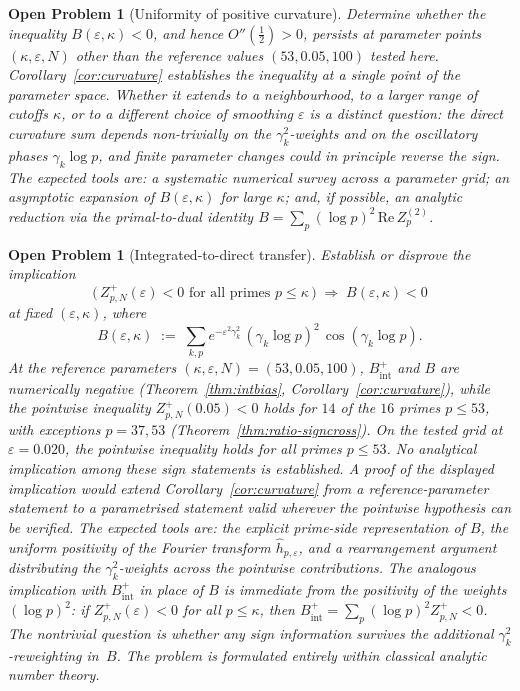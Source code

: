 \documentclass[11pt]{article}
\newtheorem{openproblem}[theorem]{Open Problem}
\begin{document}
\begin{openproblem}[Uniformity of positive curvature]\label{op:uniform}
\label{op:uniformity}
Determine whether the inequality $B(\varepsilon,\kappa)<0$, and hence
$O''(\tfrac12)>0$, persists at parameter points
$(\kappa,\varepsilon,N)$ other than the reference values
$(53,0.05,100)$ tested here.
Corollary~\ref{cor:curvature} establishes the inequality at a single
point of the parameter space.
Whether it extends to a neighbourhood, to a larger range of cutoffs
$\kappa$, or to a different choice of smoothing $\varepsilon$ is a
distinct question: the direct curvature sum depends non-trivially on
the $\gamma_k^2$-weights and on the oscillatory phases $\gamma_k\log p$,
and finite parameter changes could in principle reverse the sign.
The expected tools are: a systematic numerical survey across a
parameter grid; an asymptotic expansion of $B(\varepsilon,\kappa)$ for
large $\kappa$; and, if possible, an analytic reduction via the
primal-to-dual identity $B=\sum_p(\log p)^2\,\mathrm{Re}\,Z_p^{(2)}$.
\end{openproblem}

\begin{openproblem}[Integrated-to-direct transfer]\label{op:transfer}
Establish or disprove the implication
\[
\bigl(\,Z_{p,N}^+(\varepsilon)<0 \text{ for all primes }
p\le\kappa\,\bigr)
\;\Longrightarrow\;
B(\varepsilon,\kappa)<0
\]
at fixed $(\varepsilon,\kappa)$, where
\[
B(\varepsilon,\kappa) \;:=\; \sum_{k,p} e^{-\varepsilon^2\gamma_k^2}\,
(\gamma_k\log p)^2\,\cos(\gamma_k\log p).
\]
At the reference parameters $(\kappa,\varepsilon,N)=(53,0.05,100)$,
$B^+_{\mathrm{int}}$ and $B$ are numerically negative
(Theorem~\ref{thm:intbias}, Corollary~\ref{cor:curvature}),
while the pointwise inequality $Z_{p,N}^+(0.05)<0$ holds for
$14$ of the $16$ primes $p\le 53$, with exceptions $p=37,53$
(Theorem~\ref{thm:ratio-signcross}).
On the tested grid at $\varepsilon=0.020$, the pointwise inequality
holds for all primes $p\le 53$.
No analytical implication among these sign statements is established.
A proof of the displayed implication would extend
Corollary~\ref{cor:curvature} from a reference-parameter statement to
a parametrised statement valid wherever the pointwise hypothesis can
be verified.
The expected tools are: the explicit prime-side representation of $B$,
the uniform positivity of the Fourier transform
$\widehat{h}_{p,\varepsilon}$, and a rearrangement argument
distributing the $\gamma_k^2$-weights across the pointwise
contributions.
The analogous implication with $B^+_{\mathrm{int}}$ in place of $B$ is
immediate from the positivity of the weights $(\log p)^2$:
if $Z_{p,N}^+(\varepsilon)<0$ for all $p\le\kappa$, then
$B^+_{\mathrm{int}}=\sum_p(\log p)^2 Z_{p,N}^+<0$.
The nontrivial question is whether any sign information survives
the additional $\gamma_k^2$-reweighting in~$B$.
The problem is formulated entirely within classical analytic number theory.
\end{openproblem}
\end{document}
